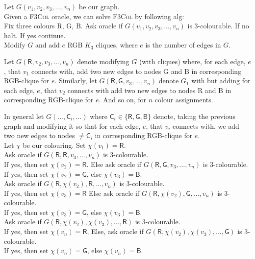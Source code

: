 \documentclass[a4paper, draft, 12pt]{article}
\begin{document}
\begin{enumerate}
\begin{enumerate}
\begin{enumerate}
  Let $G(v_1,v_2,v_3,...,v_n)$ be our graph. \\
  Given a \textsc{F3Col} oracle, we can solve \textsc{F3Col} by following alg:\\
  Fix three colours \textsf{R}, \textsf{G}, \textsf{B}. 
  Ask oracle if $G(v_1,v_2,v_3,...,v_n)$ is 3-colourable. If no halt. If yes continue.\\

  Modify $G$ and add $e$ \textsf{RGB} $K_3$ cliques, where $e$ is the number of edges in $G$.

  Let $G(\textsf{R},v_2,v_3,...,v_n)$ denote modifying $G$ (with cliques) where,
  for each edge, $e$, that $v_1$ connects with, add two new edges to nodes \textsf{G} and \textsf{B} 
  in corresponding \textsf{RGB}-clique for $e$.
  Similarly, let $G(\textsf{R},\textsf{G},v_3,...,v_n)$ denote $G_1$ with
  but adding for each edge, $e$, that $v_2$ connects with
  add two new edges to nodes \textsf{R} and \textsf{B} 
  in corresponding \textsf{RGB}-clique for $e$. And so on, for $n$ colour assignments.

  In general let $G(...,\textsf{C}_i,...)$ where $\textsf{C}_i \in \{\textsf{R},\textsf{G},\textsf{B}\}$
  denote, taking the previous graph and modifying it 
  so that for each edge, $e$, that $v_i$ connects with, we add two new edges to nodes $\neq \textsf{C}_i$
  in corresponding \textsf{RGB}-clique for $e$.\\
  
  Let $\chi$ be our colouring. Set $\chi(v_1) = \textsf{R}$. \\ 
  Ask oracle if $G(\textsf{R},\textsf{R},v_3,...,v_n)$ is 3-colourable.\\
  If yes, then set $\chi(v_2) = \textsf{R}$.
  Else ask oracle if $G(\textsf{R},\textsf{G},v_3,...,v_n)$ is 3-colourable.\\
  If yes, then set $\chi(v_2) = \textsf{G}$, else $\chi(v_3) = \textsf{B}$. \\

  Ask oracle if $G(\textsf{R},\chi(v_2),\textsf{R},...,v_n)$ is 3-colourable.\\
  If yes, then set $\chi(v_3) = \textsf{R}$
  Else ask oracle if $G(\textsf{R},\chi(v_2),\textsf{G},...,v_n)$ is 3-colourable.\\
  If yes, then set $\chi(v_3) = \textsf{G}$, else $\chi(v_3) = \textsf{B}$. \\

  Ask oracle if $G(\textsf{R},\chi(v_2),\chi(v_3),...,\textsf{R})$ is 3-colourable.\\
  If yes, then set $\chi(v_n) = \textsf{R}$,
  Else, ask oracle if $G(\textsf{R},\chi(v_2),\chi(v_3),...,\textsf{G})$ is 3-colourable.\\
  If yes, then set $\chi(v_n) = \textsf{G}$, else $\chi(v_n) = \textsf{B}$.


\end{enumerate}
\end{enumerate}
\end{enumerate}
\end{document}
